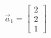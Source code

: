 \documentclass[preview]{standalone}
\begin{document}
\begin{align*}
\vec{a}_1=\begin{bmatrix} 2 \\ 2 \\ 1 \end{bmatrix}
\end{align*}
\end{document}
